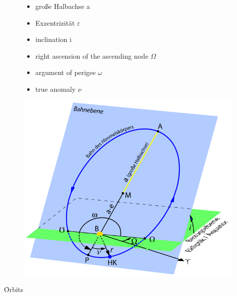 \begin{figure}[!ht]
\begin{minipage}{0.35\textwidth}
 \begin{itemize}
  \item große Halbachse a
  \item Exzentrizität $\varepsilon$
  \item inclination i
  \item right ascension of the ascending node $\Omega$
  \item argument of perigee $\omega$
  \item true anomaly $\nu$
 \end{itemize} 
\end{minipage}
\hfill
\begin{minipage}{0.64\textwidth}
  \centering
  \includegraphics[scale=0.5]{BahnelementeEllipse}
\end{minipage}
\end{figure}
\newpage 
\noindent \f{Orbits}

